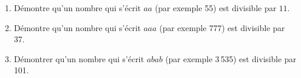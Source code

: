 
\begin{enumerate}
\item Démontre qu'un nombre qui s'écrit $aa$ (par exemple 55) est divisible par $11$.
\item Démontre qu'un nombre qui s'écrit $aaa$ (par exemple 777) est 
divisible par 37.
\item Démontrer qu'un nombre qui s'écrit $abab$ (par exemple 3\,535) est divisible par 101.
\end{enumerate}
